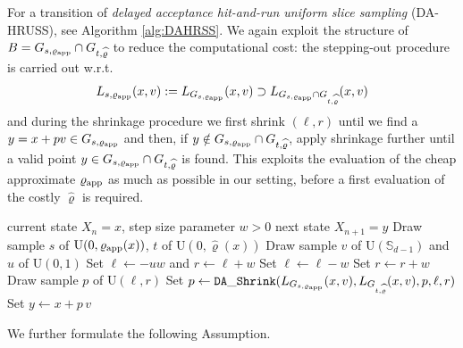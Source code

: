 \documentclass[sn-mathphys-num]{sn-jnl}%
\theoremstyle{thmstyleone}%
\theoremstyle{thmstyletwo}%
\theoremstyle{thmstylethree}%
\newcommand{\rhoapp}{\varrho_{{\rm app}}}
\begin{document}
For a transition of \emph{delayed acceptance hit-and-run uniform slice sampling} (DA-HRUSS), see Algorithm \ref{alg:DAHRSS}. We again exploit the structure of $B = G_{s,\rhoapp} \cap G_{t,\widehat{\varrho}}$ to reduce the computational cost: the stepping-out procedure is carried out w.r.t. 
\[
    L_{s,\rhoapp}(x,v) := L_{G_{s,\rhoapp}}(x,v) 
    \supset L_{G_{s,\rhoapp}\cap G_{t,\widehat{\varrho}}}(x,v)
\]
and during the shrinkage procedure we first shrink $(\ell,r)$ until we find a $y = x + p v \in G_{s,\rhoapp}$ and then, if $y \notin G_{s,\rhoapp}\cap G_{t,\widehat{\varrho}}$, apply shrinkage further until a valid point $y \in G_{s,\rhoapp}\cap G_{t,\widehat{\varrho}}$ is found. 
This exploits the evaluation of the cheap approximate $\rhoapp$ as much as possible in our setting, before a first evaluation of the costly $\widehat{\varrho}$ is required.

\begin{algorithm}
   \caption{Delayed Acceptance Hit-And-Run Slice Sampling}\label{alg:DAHRSS}
   \renewcommand{\algorithmicrequire}{\textbf{Input:}}
   \renewcommand{\algorithmicensure}{\textbf{Output:}}
   \begin{algorithmic}[1]
		\Require current state $X_n = x$, step size parameter $w>0$
	    \Ensure next state $X_{n+1} = y$
        \State Draw sample $s$ of $\mathrm{U}(0,\rhoapp(x))$, $t$ of $\mathrm{U}(0,\widehat{\varrho}(x))$
        \State Draw sample $v$ of $\mathrm{U}(\mathbb{S}_{d-1})$ and $u$ of $\mathrm{U}(0,1)$ 
        \State Set $\ell \leftarrow -uw$ and $r \leftarrow \ell+w$
        \While{$\ell \in L_{s,\rhoapp}(x,v)$} 
        \State Set $\ell \leftarrow \ell-w$
		\EndWhile
        \While{$r \in L_{s,\rhoapp}(x,v)$} 
        \State Set $r \leftarrow r+w$
		\EndWhile
        \State Draw sample $p$ of $\mathrm{U}(\ell,r)$
        \State Set $p \leftarrow \mathtt{DA\text{\_}Shrink}(L_{G_{s,\rhoapp}}(x,v), L_{G_{t,\widehat{\varrho}}}(x,v), p, \ell, r)$
        \State Set $y \leftarrow x+p\,v$
	\end{algorithmic}
\end{algorithm}

We further formulate the following Assumption.
\end{document}
